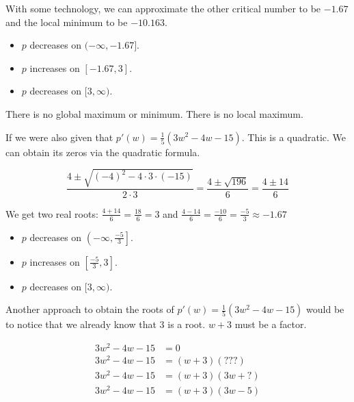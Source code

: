 \documentclass{ximera}
\begin{document}
\begin{example}
\begin{image}
\end{image}

With some technology, we can approximate the other critical number to be $-1.67$ and the local minimum to be $-10.163$.


\begin{itemize}
\item $p$ decreases on $(-\infty, -1.67]$.
\item $p$ increases on $[-1.67, 3]$.
\item $p$ decreases on $[3, \infty)$.
\end{itemize}



There is no global maximum or minimum.  There is no local maximum.



\end{example}




If we were also given that $p'(w) = \frac{1}{5}(3w^2 - 4w - 15)$.  This is a quadratic.  We can obtain its zeros via the quadratic formula.


\[  \frac{4 \pm \sqrt{(-4)^2 - 4 \cdot 3 \cdot (-15)}}{2 \cdot 3} =    \frac{4 \pm \sqrt{196}}{6}  = \frac{4 \pm 14}{6}       \]

We get two real roots: $\frac{4 + 14}{6} = \frac{18}{6} = 3$  and $\frac{4 - 14}{6} = \frac{-10}{6} = \frac{-5}{3} \approx -1.67$



\begin{itemize}
\item $p$ decreases on $\left(-\infty, \frac{-5}{3}\right]$.
\item $p$ increases on $\left[\frac{-5}{3}, 3\right]$.
\item $p$ decreases on $[3, \infty)$.
\end{itemize}



Another approach to obtain the roots of $p'(w) = \frac{1}{5}(3w^2 - 4w - 15)$ would be to notice that we already know that $3$ is a root. $w+3$ must be a factor.



\begin{align*}
3w^2 - 4w - 15     & = 0        \\
3w^2 - 4w - 15     & = (w+3)(???)        \\
3w^2 - 4w - 15     & = (w+3)(3w + ?)        \\
3w^2 - 4w - 15     & = (w+3)(3w - 5)        
\end{align*}
\end{document}
